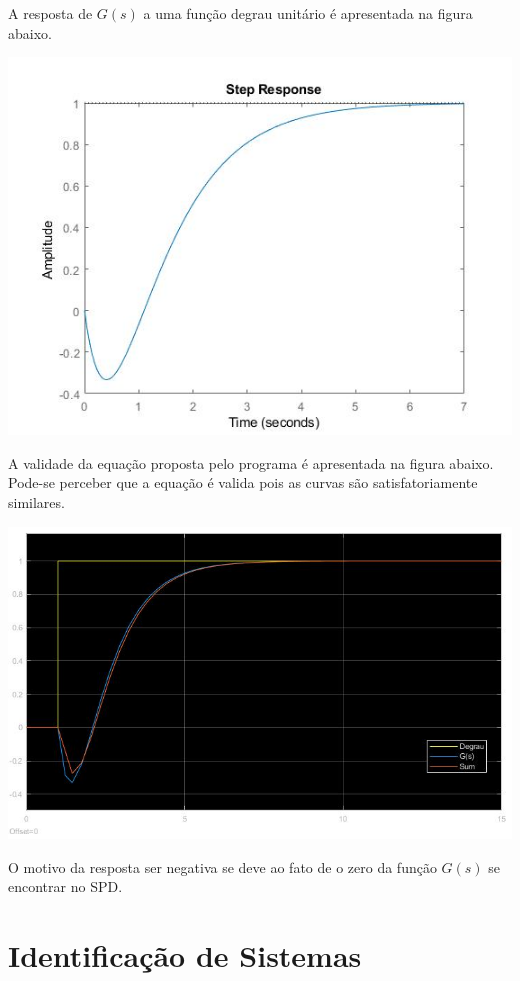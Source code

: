 \documentclass[
]{book}
\theoremstyle{definition}
\theoremstyle{definition}
\theoremstyle{definition}
\theoremstyle{remark}
\begin{document}
A resposta de \(G(s)\) a uma função degrau unitário é apresentada na figura abaixo.

\includegraphics{Imagens/Lab2/prob6B.jpg}

A validade da equação proposta pelo programa é apresentada na figura abaixo. Pode-se perceber que a equação é valida pois as curvas são satisfatoriamente similares.

\includegraphics{Imagens/Lab2/prob6C.jpg}

O motivo da resposta ser negativa se deve ao fato de o zero da função \(G(s)\) se encontrar no SPD.

\hypertarget{lab3}{%
\chapter{Identificação de Sistemas}\label{lab3}}
\end{document}
